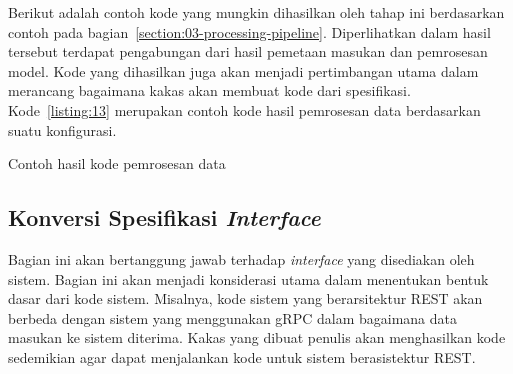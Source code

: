 Berikut adalah contoh kode yang mungkin dihasilkan oleh tahap ini berdasarkan contoh pada bagian~\ref{section:03-processing-pipeline}.
Diperlihatkan dalam hasil tersebut terdapat pengabungan dari hasil pemetaan masukan dan pemrosesan model.
Kode yang dihasilkan juga akan menjadi pertimbangan utama dalam merancang bagaimana kakas akan membuat kode dari spesifikasi.
Kode~\ref{listing:13} merupakan contoh kode hasil pemrosesan data berdasarkan suatu konfigurasi. 

\begin{code}
	\caption{Contoh hasil kode pemrosesan data}\label{listing:13}
\end{code}

\subsection{Konversi Spesifikasi \textit{Interface}}

Bagian ini akan bertanggung jawab terhadap \textit{interface} yang disediakan oleh sistem.
Bagian ini akan menjadi konsiderasi utama dalam menentukan bentuk dasar dari kode sistem.
Misalnya, kode sistem yang berarsitektur REST  akan berbeda dengan sistem yang menggunakan gRPC dalam bagaimana data masukan ke sistem diterima.
Kakas yang dibuat penulis akan menghasilkan kode sedemikian agar dapat menjalankan kode untuk sistem berasistektur REST.\@
